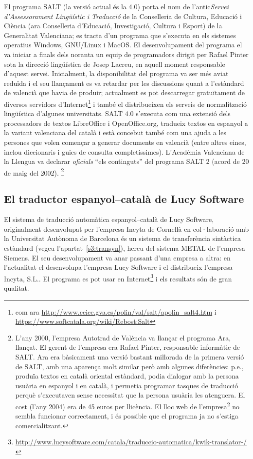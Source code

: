 El programa SALT (la versió actual és la 4.0) porta el nom de
l'antic\emph{Servei d'Assessorament Lingüístic i Traducció} de la
Conselleria de Cultura, Educació i Ciència (ara Conselleria
d'Educació, Investigació, Cultura i Esport) de la Generalitat
Valenciana; es tracta d'un programa que s'executa en els sistemes
operatius Windows, GNU/Linux i MacOS. El desenvolupament del programa
el va iniciar a finals dels noranta un equip de
programadors dirigit per Rafael Pinter sota la direcció lingüística de
Josep Lacreu, en aquell moment responsable d'aquest servei.
Inicialment, la disponibilitat del programa va ser més aviat reduïda i
el seu llançament es va retardar per les discussions quant a
l'estàndard de valencià que havia de produir; actualment es pot
descarregar gratuïtament de diversos servidors d'Internet\footnote{com
  ara \url{http://www.ceice.gva.es/polin/val/salt/apolin_salt4.htm} i
  \url{https://www.softcatala.org/wiki/Rebost:Salt}} i també el
distribueixen els serveis de normalització lingüística d'algunes
universitats.  SALT 4.0 s'executa com una extensió dels processadors
de textos LibreOffice i OpenOffice.org, tradueix textos en espanyol a
la variant valenciana del català i està concebut també com una ajuda a
les persones que volen començar a generar documents en valencià (entre
altres eines, inclou diccionaris i guies de consulta completíssimes).
L'Acadèmia Valenciana de la Llengua va declarar \emph{oficials} ``els
continguts'' del programa SALT 2 (acord de 20 de maig del
2002). \footnote{L'any 2000, l'empresa Autotrad de València va llançar
  el programa Ara, llançat. El gerent de l'empresa era Rafael Pinter,
  responsable informàtic de SALT. Ara era bàsicament una versió
  bastant millorada de la primera versió de SALT, amb una aparença
  molt similar però amb algunes diferències: p.e., produïa textos en
  català oriental estàndard, podia dialogar amb la persona usuària en
  espanyol i en català, i permetia programar tasques de traducció
  perquè s'executaven sense necessitat que la persona usuària les
  atenguera. El cost (l'any 2004) era de 45 euros per llicència. El
  lloc web de l'empresa\footnote{\url{http://www.ara-autotrad.es}} no
  sembla funcionar correctament, i és possible que el programa ja
  no s'estiga comercialitzant.}

\subsection{El traductor espanyol--català de Lucy Software}

El sistema de traducció automàtica espanyol--català de Lucy Software,
originalment desenvolupat per l'empresa Incyta de Cornellà en
col·laboració amb la Universitat Autònoma de Barcelona és un sistema
de transferència sintàctica estàndard (vegeu
l'apartat~\ref{s3:transyn}), hereu del sistema METAL de l'empresa
Siemens. El seu desenvolupament va anar passant d'una empresa a altra:
en l'actualitat el desenvolupa l'empresa Lucy Software i el
distribueix l'empresa Incyta, S.L.. El programa es pot usar en
Internet\footnote{\url{http://www.lucysoftware.com/catala/traduccio-automatica/kwik-translator-/}}
i els resultats són de gran qualitat.

